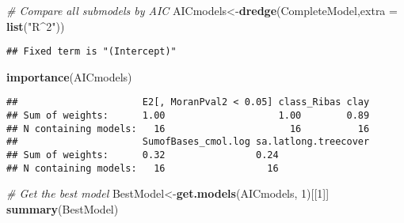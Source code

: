 \documentclass[]{article}
\newenvironment{Shaded}{\begin{snugshade}}{\end{snugshade}}
\newcommand{\CommentTok}[1]{\textcolor[rgb]{0.56,0.35,0.01}{\textit{#1}}}
\newcommand{\DataTypeTok}[1]{\textcolor[rgb]{0.13,0.29,0.53}{#1}}
\newcommand{\DecValTok}[1]{\textcolor[rgb]{0.00,0.00,0.81}{#1}}
\newcommand{\KeywordTok}[1]{\textcolor[rgb]{0.13,0.29,0.53}{\textbf{#1}}}
\newcommand{\NormalTok}[1]{#1}
\newcommand{\StringTok}[1]{\textcolor[rgb]{0.31,0.60,0.02}{#1}}
\begin{document}
\begin{Shaded}
\begin{Highlighting}[]
\CommentTok{# Compare all submodels by AIC  }
\NormalTok{AICmodels<-}\KeywordTok{dredge}\NormalTok{(CompleteModel,}\DataTypeTok{extra =} \KeywordTok{list}\NormalTok{(}\StringTok{"R^2"}\NormalTok{))}
\end{Highlighting}
\end{Shaded}

\begin{verbatim}
## Fixed term is "(Intercept)"
\end{verbatim}

\begin{Shaded}
\begin{Highlighting}[]
\KeywordTok{importance}\NormalTok{(AICmodels)}
\end{Highlighting}
\end{Shaded}

\begin{verbatim}
##                      E2[, MoranPval2 < 0.05] class_Ribas clay
## Sum of weights:      1.00                    1.00        0.89
## N containing models:   16                      16          16
##                      SumofBases_cmol.log sa.latlong.treecover
## Sum of weights:      0.32                0.24                
## N containing models:   16                  16
\end{verbatim}

\begin{Shaded}
\begin{Highlighting}[]
\CommentTok{# Get the best model}
\NormalTok{BestModel<-}\KeywordTok{get.models}\NormalTok{(AICmodels, }\DecValTok{1}\NormalTok{)[[}\DecValTok{1}\NormalTok{]]}
\KeywordTok{summary}\NormalTok{(BestModel)}
\end{Highlighting}
\end{Shaded}
\end{document}
